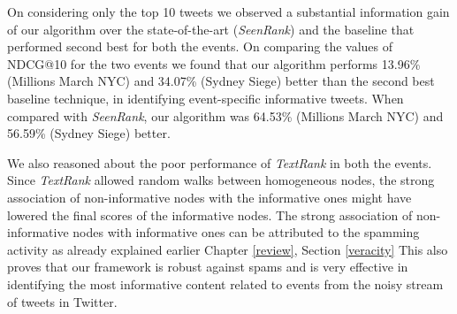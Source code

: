 On considering only the top 10 tweets we observed a substantial information gain of our algorithm over the state-of-the-art (\textit{SeenRank}) and the baseline that performed second best for both the events. On comparing the values of NDCG@10 for the two events we found that our algorithm performs 13.96\% (Millions March NYC) and 34.07\% (Sydney Siege) better than the second best baseline technique, in identifying event-specific informative tweets. When compared with \textit{SeenRank}, our algorithm was 64.53\% (Millions March NYC) and 56.59\% (Sydney Siege) better. 

We also reasoned about the poor performance of \textit{TextRank} in both the events. Since \textit{TextRank} allowed random walks between homogeneous nodes, the strong association of non-informative nodes with the informative ones might have lowered the final scores of the informative nodes. The strong association of non-informative nodes with informative ones can be attributed to the spamming activity as already explained earlier Chapter \ref{review}, Section \ref{veracity} This also proves that our framework is robust against spams and is very effective in identifying the most informative content related to events from the noisy stream of tweets in Twitter. 

